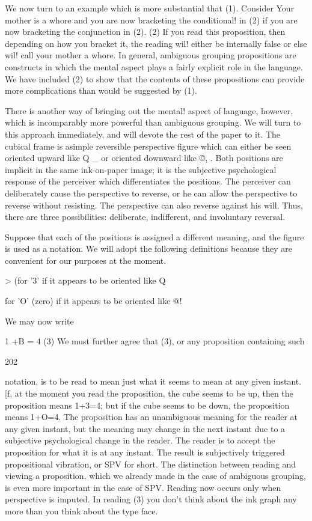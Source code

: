 \documentclass[10pt,twoside]{memoir}
\begin{document}
\begin{enumerate}
{\begin{enumerate}
\begin{sysrules}
\begin{sysrules}
\begin{sysrules}
\begin{sysrules}
{\begin{enumerate}
{{{{{{{{{{We now turn to an example which is more substantial that (1). 
Consider 
Your mother is a whore and you are now bracketing the conditional! in (2) if 
you are now bracketing the conjunction in (2). (2) 
If you read this proposition, then depending on how you bracket it, the 
reading wil! either be internally false or else wil! call your mother a whore. In 
general, ambiguous grouping propositions are constructs in which the mental 
aspect plays a fairly explicit role in the language. We have included (2) to 
show that the contents of these propositions can provide more complications 
than would be suggested by (1). 


There is another way of bringing out the mental! aspect of language, 
however, which is incomparably more powerful than ambiguous grouping. 
We will turn to this approach immediately, and will devote the rest of the 
paper to it. The cubical frame is asimple reversible perspective figure 
which can either be seen oriented upward like Q _ or oriented downward 
like ©, . Both positions are implicit in the same ink-on-paper image; it is 
the subjective psychological response of the perceiver which differentiates 
the positions. The perceiver can deliberately cause the perspective to reverse, 
or he can allow the perspective to reverse without resisting. The perspective 
can also reverse against his will. Thus, there are three possibilities: deliberate, 
indifferent, and involuntary reversal. 

Suppose that each of the positions is assigned a different meaning, and 
the figure is used as a notation. We will adopt the following definitions 
because they are convenient for our purposes at the moment. 

> (for '3' if it appears to be oriented like Q 

for 'O' (zero) if it appears to be oriented like @! 

We may now write 


1 +B = 4 (3) 
We must further agree that (3), or any proposition containing such 


202 


notation, is to be read to mean just what it seems to mean at any given 
instant. [f, at the moment you read the proposition, the cube seems to be 
up, then the proposition means 1+3=4; but if the cube seems to be down, 
the proposition means 1+O=4. The proposition has an unambiguous 
meaning for the reader at any given instant, but the meaning may change in 
the next instant due to a subjective psychological change in the reader. The 
reader is to accept the proposition for what it is at any instant. The result is 
subjectively triggered propositional vibration, or SPV for short. The 
distinction between reading and viewing a proposition, which we already 
made in the case of ambiguous grouping, is even more important in the case 
of SPV. Reading now occurs only when perspective is imputed. In reading 
(3) you don't think about the ink graph any more than you think about the 
type face. 

}}}}}}}}}}
\end{enumerate}}
\end{sysrules}
\end{sysrules}
\end{sysrules}
\end{sysrules}
\end{enumerate}}
\end{enumerate}
\end{document}
